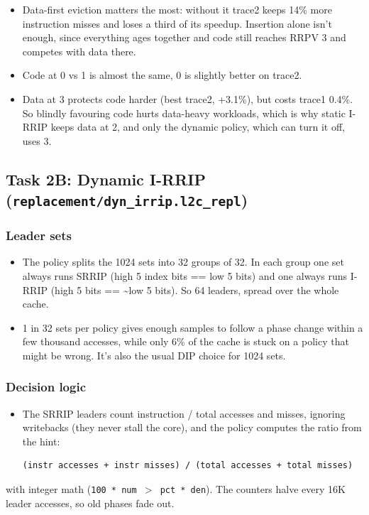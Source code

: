 \documentclass[10pt]{article}
\providecommand{\tightlist}{%
  \setlength{\itemsep}{2pt}\setlength{\parskip}{0pt}}
\begin{document}
\begin{itemize}
\tightlist
\item Data-first eviction matters the most: without it trace2 keeps 14\% more instruction misses and loses a third of its speedup. Insertion alone isn't enough, since everything ages together and code still reaches RRPV 3 and competes with data there.
\item Code at 0 vs 1 is almost the same, 0 is slightly better on trace2.
\item Data at 3 protects code harder (best trace2, +3.1\%), but costs trace1 0.4\%. So blindly favouring code hurts data-heavy workloads, which is why static I-RRIP keeps data at 2, and only the dynamic policy, which can turn it off, uses 3.
\end{itemize}

\subsection{Task 2B: Dynamic I-RRIP (\texttt{replacement/dyn\_irrip.l2c\_repl})}

\subsubsection{Leader sets}

\begin{itemize}
\tightlist
\item The policy splits the 1024 sets into 32 groups of 32. In each group one set always runs SRRIP (high 5 index bits == low 5 bits) and one always runs I-RRIP (high 5 bits == \textasciitilde{}low 5 bits). So 64 leaders, spread over the whole cache.
\item 1 in 32 sets per policy gives enough samples to follow a phase change within a few thousand accesses, while only 6\% of the cache is stuck on a policy that might be wrong. It's also the usual DIP choice for 1024 sets.
\end{itemize}

\subsubsection{Decision logic}

\begin{itemize}
\tightlist
\item The SRRIP leaders count instruction / total accesses and misses, ignoring writebacks (they never stall the core), and the policy computes the ratio from the hint:

\begin{verbatim}
(instr accesses + instr misses) / (total accesses + total misses)
\end{verbatim}
\end{itemize}
  with integer math (\texttt{100 * num $>$ pct * den}). The counters halve every 16K leader accesses, so old phases fade out.
\end{document}
